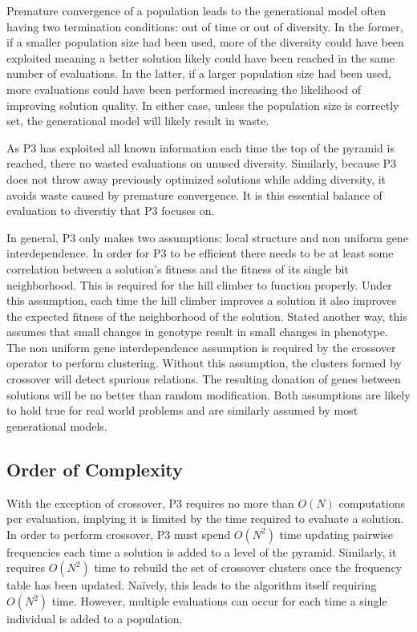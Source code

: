 \documentclass{sig-alternate}
\begin{document}
Premature convergence of a population leads to the generational model
often having two termination conditions: out of time or out of
diversity.  In the former, if a smaller population size had been used,
more of the diversity could have been exploited meaning a better
solution likely could have been reached in the same number of
evaluations.  In the latter, if a larger population size had been
used, more evaluations could have been performed increasing the
likelihood of improving solution quality.  In
either case, unless the population size is correctly set, the
generational model will likely result in waste.

As P3 has exploited all known information each time the top of the pyramid is reached,
there no wasted evaluations on unused diversity.  Similarly, because P3
does not throw away previously optimized solutions while adding diversity, it avoids
waste caused by premature convergence. It is this essential balance of
evaluation to diverstiy that P3 focuses on.

In general, P3 only makes two assumptions: local structure and non uniform gene interdependence.
In order for P3 to be efficient there needs to be at least some correlation between a
solution's fitness and the fitness of its single bit neighborhood.  This is required for
the hill climber to function properly.  Under this assumption, each time the hill climber
improves a solution it also improves the expected fitness of the neighborhood of the solution.
Stated another way, this assumes that small changes in genotype result in small changes in phenotype.
The non uniform gene interdependence assumption is required by the crossover operator to
perform clustering.  Without this assumption, the clusters formed by crossover will
detect spurious relations. The resulting donation of genes between solutions will be
no better than random modification.  Both assumptions are likely to hold true for
real world problems and are similarly assumed by most generational models.

\subsection{Order of Complexity}
With the exception of crossover, P3 requires no more than $O(N)$ computations
per evaluation, implying it is limited by the time required to evaluate a solution.
In order to perform crossover, P3 must spend $O(N^2)$ time updating pairwise
frequencies each time a solution is added to a level of the pyramid.  Similarly,
it requires $O(N^2)$ time to rebuild the set of crossover clusters once the frequency
table has been updated.  Na\"ively, this leads to the algorithm itself requiring $O(N^2)$ time.
However, multiple evaluations can occur for each time a single individual is added
to a population.
\end{document}

